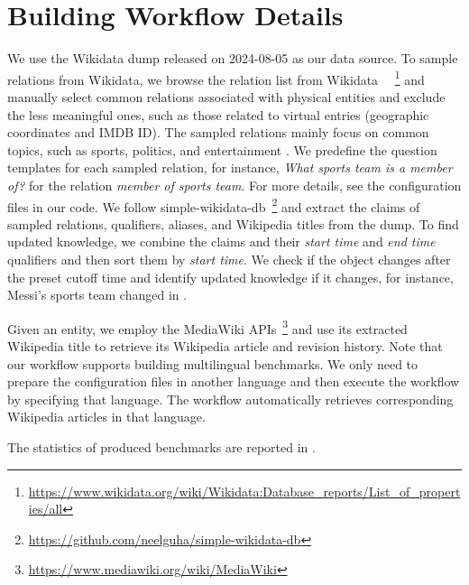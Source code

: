 \clearpage
\appendix



\section{Building Workflow Details} \label{app_workflow}
    We use the Wikidata dump released on 2024-08-05 as our data source.
    To sample relations from Wikidata,
    we browse the relation list from Wikidata~\cite{wikidata2014} ~\footnote{\url{https://www.wikidata.org/wiki/Wikidata:Database_reports/List_of_properties/all}}
    and manually select common relations associated with physical entities and exclude the less meaningful ones, such as those related to virtual entries (\eg geographic coordinates and IMDB ID).
    The sampled relations mainly focus on common topics, such as sports, politics, and entertainment
    \cite{wu2020short,wu2022mitigating,wu2023infoctm,wu2024dynamic,wu2024traco,wu2024topmost,wu2024survey,wu2024fastopic}.
    We predefine the question templates for each sampled relation,
    for instance, \textit{What sports team is {} a member of?} for the relation \textit{member of sports team}.
    For more details, see the configuration files in our code.
    We follow simple-wikidata-db~\footnote{\url{https://github.com/neelguha/simple-wikidata-db}}
    and
    extract the claims of sampled relations, qualifiers, aliases, and Wikipedia titles from the dump.
    To find updated knowledge, we combine the claims and their \textit{start time} and \textit{end time} qualifiers
    and then sort them by \textit{start time}.
    We check if the object changes after the preset cutoff time and identify updated knowledge if it changes, for instance, Messi's sports team changed in .

    Given an entity, we employ the MediaWiki APIs~\footnote{\url{https://www.mediawiki.org/wiki/MediaWiki}} and use its extracted Wikipedia title to retrieve its Wikipedia article and revision history.
    Note that our workflow supports building multilingual benchmarks.
    We only need to prepare the configuration files in another language and then execute the workflow by specifying that language.
    The workflow automatically retrieves corresponding Wikipedia articles in that language.

    The statistics of produced benchmarks are reported in .



